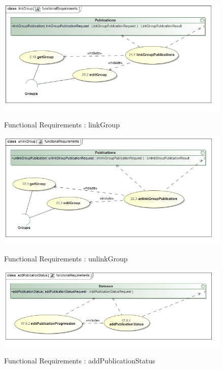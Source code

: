 \documentclass{article}
\begin{document}
		\begin{figure}[H]
		\includegraphics[width=\textwidth]{Quinton_Diagrams/class__linkGroup__functionalRequirements.jpg}  \\
		\caption{Functional Requirements : linkGroup}
		\end{figure}
		
		\begin{figure}[H]
		\includegraphics[width=\textwidth]{Quinton_Diagrams/class__unlinkGroup__functionalRequirements.jpg}  \\
		\caption{Functional Requirements : unlinkGroup}
		\end{figure}
		
		\begin{figure}[H]
		\includegraphics[width=\textwidth]{Quinton_Diagrams/class__addPublicationStatus__functionalRequirements.jpg}  \\
		\caption{Functional Requirements : addPublicationStatus}
		\end{figure}
		
\end{document}
